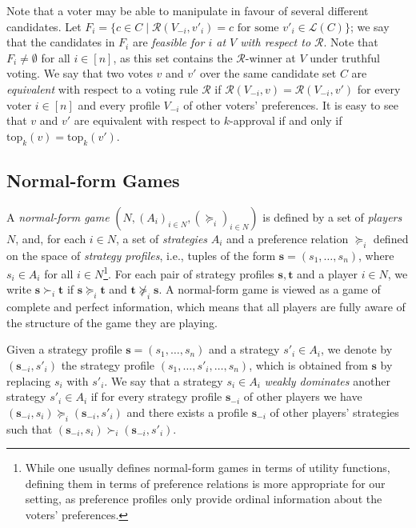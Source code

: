 \documentclass[11pt]{article}
\renewcommand\vec{\mathbf}
\newcommand{\calR}{\mathcal{R}}
\newcommand{\calL}{\mathcal{L}}
\newcommand{\tp}{\mathrm{top}}
\begin{document}
Note that a voter may be able to manipulate in favour
of several different candidates. 
Let $F_i=\{c\in C\mid \calR(V_{-i}, v'_i)=c\textrm{ for some }v'_i\in \calL(C)\}$;
we say that the candidates in $F_i$ are {\em feasible for $i$ at $V$ with respect to $\calR$}. 
Note that $F_i\neq\emptyset$ for all $i\in [n]$, as this set contains the $\calR$-winner at $V$
under truthful voting.
We say that two votes $v$ and $v'$ over the same candidate set $C$
are {\em equivalent} with respect to a voting rule $\calR$
if $\calR(V_{-i}, v)=\calR(V_{-i}, v')$ for every voter $i\in[n]$ and every profile $V_{-i}$
of other voters' preferences. 
It is easy to see that
$v$ and $v'$ are equivalent with respect to $k$-approval if and only if $\tp_k(v)=\tp_k(v')$.


\subsection{Normal-form Games}
A {\em normal-form game} $(N, (A_i)_{i\in N}, (\succeq_i)_{i\in N})$  is defined by a set of {\em players} $N$, and,
for each $i\in N$,  a set of {\em strategies} $A_i$ and a preference relation $\succeq_i$
defined on the space of {\em strategy profiles}, i.e., tuples of the form ${\vec s}=(s_1, \dots, s_n)$,
where $s_i\in A_i$ for all $i\in N$\footnote{While one usually defines normal-form games in terms of utility functions,
 defining them in terms of preference relations is more appropriate for our setting,
as preference profiles only provide ordinal information about the voters' preferences.}.
For each pair of strategy profiles ${\vec s}, {\vec t}$ and a player $i\in N$, we write ${\vec s}\succ_i {\vec t}$
if ${\vec s}\succeq_i {\vec t}$ and ${\vec t}\not\succeq_i {\vec s}$.
A normal-form game is viewed as a game of complete and perfect information,
which means that all players are fully aware of the structure of the game they are playing.

Given a strategy profile ${\vec s}=(s_1, \dots, s_n)$ and a strategy $s'_i\in A_i$,
we denote by $({\vec s}_{-i},s'_i)$
the strategy profile $(s_1,\ldots, s'_i,\ldots,s_n)$,
which is obtained from $\vec s$ by replacing $s_i$ with $s'_i$.
We say that a strategy $s_i\in A_i$ {\em weakly dominates} another strategy $s'_i\in A_i$
if  for every strategy profile ${\vec s}_{-i}$ of other players we have 
$({\vec s}_{-i}, s_i)\succeq_i ({\vec s}_{-i},s'_i)$ and
there exists a profile ${\vec s}_{-i}$ of other players' strategies such that
$({\vec s}_{-i}, s_i)\succ_i ({\vec s}_{-i},s'_i)$.
\end{document}
